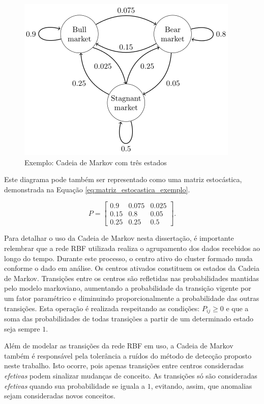 \documentclass[msc, classic, a4paper]{ufbathesis}
\begin{document}
\begin{figure}[H]
    \begin{center}
        \includegraphics[scale=0.75]{imagens/markov_chain_wikipedia.png}
        \caption{Exemplo: Cadeia de Markov com três estados \cite{wiki:Markov_chain}}
        \label{fig:cadeia_markov_tres_estados}
    \end{center}
\end{figure}

Este diagrama pode também ser representado como uma matriz estocástica, demonstrada na Equação \ref{eq:matriz_estocastica_exemplo}.

\begin{equation}
\label{eq:matriz_estocastica_exemplo}
P={\begin{bmatrix}0.9&0.075&0.025\\0.15&0.8&0.05\\0.25&0.25&0.5\end{bmatrix}}.
\end{equation}

Para detalhar o uso da Cadeia de Markov nesta dissertação, é importante relembrar que a rede RBF utilizada realiza o agrupamento dos dados recebidos ao longo do tempo.
Durante este processo, o centro ativo do cluster formado muda conforme o dado em análise.
Os centros ativados constituem os estados da Cadeia de Markov.
Transições entre os centros são refletidas nas probabilidades mantidas pelo modelo markoviano, aumentando a probabilidade da transição vigente por um fator paramétrico e diminuindo proporcionalmente a probabilidade das outras transições.
Esta operação é realizada respeitando as condições: $P_{ij} \geq 0$ e que a soma das probabilidades de todas transições a partir de um determinado estado seja sempre $1$.

Além de modelar as transições da rede RBF em uso, a Cadeia de Markov também é responsável pela tolerância a ruídos do método de detecção proposto neste trabalho.
Isto ocorre, pois apenas transições entre centros consideradas \textit{efetivas} podem sinalizar mudanças de conceito.
As transições só são consideradas \textit{efetivas} quando sua probabilidade se iguala a $1$, evitando, assim, que anomalias sejam consideradas novos conceitos.
\end{document}
